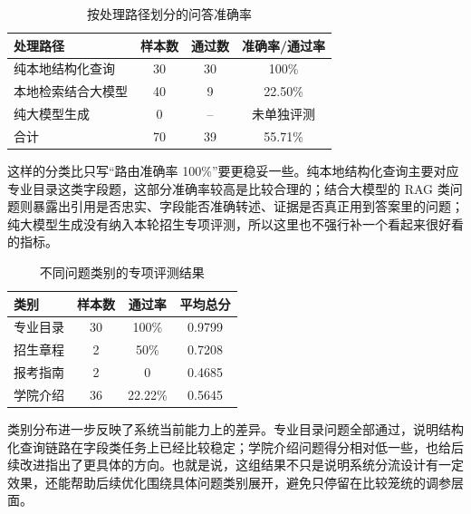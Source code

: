 \documentclass[UTF8,zihao=-4,oneside]{ctexbook}
\numberwithin{equation}{chapter}
\begin{document}
\begin{table}[H]
  \centering
  \caption{按处理路径划分的问答准确率}
  \begin{tabular}{lccc}
    \toprule
    处理路径 & 样本数 & 通过数 & 准确率/通过率 \\
    \midrule
    纯本地结构化查询 & 30 & 30 & 100\% \\
    本地检索结合大模型 & 40 & 9 & 22.50\% \\
    纯大模型生成 & 0 & -- & 未单独评测 \\
    \midrule
    合计 & 70 & 39 & 55.71\% \\
    \bottomrule
  \end{tabular}
\end{table}

这样的分类比只写“路由准确率 100\%”要更稳妥一些。纯本地结构化查询主要对应专业目录这类字段题，这部分准确率较高是比较合理的；结合大模型的 RAG 类问题则暴露出引用是否忠实、字段能否准确转述、证据是否真正用到答案里的问题；纯大模型生成没有纳入本轮招生专项评测，所以这里也不强行补一个看起来很好看的指标。

\begin{table}[H]
  \centering
  \caption{不同问题类别的专项评测结果}
  \begin{tabular}{lccc}
    \toprule
    类别 & 样本数 & 通过率 & 平均总分 \\
    \midrule
    专业目录 & 30 & 100\% & 0.9799 \\
    招生章程 & 2 & 50\% & 0.7208 \\
    报考指南 & 2 & 0 & 0.4685 \\
    学院介绍 & 36 & 22.22\% & 0.5645 \\
    \bottomrule
  \end{tabular}
\end{table}

类别分布进一步反映了系统当前能力上的差异。专业目录问题全部通过，说明结构化查询链路在字段类任务上已经比较稳定；学院介绍问题得分相对低一些，也给后续改进指出了更具体的方向。也就是说，这组结果不只是说明系统分流设计有一定效果，还能帮助后续优化围绕具体问题类别展开，避免只停留在比较笼统的调参层面。
\end{document}
